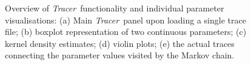 \documentclass[webpdf,mynatbib,nosurname,nogrid,noCE,noMSC]{SYS}
\newcommand{\tracer}{\emph{Tracer}}
\begin{document}
\begin{itemize}[leftmargin=*]
\begin{figure}[t]
\vspace{-0.25cm}
\caption{Overview of \tracer\ functionality and individual parameter visualisations: (a) Main \tracer\ panel upon loading a single trace file; (b) boxplot representation of two continuous parameters; (c) kernel density estimates; (d) violin plots; (e) the actual traces connecting the parameter values visited by the Markov chain.}
\label{fig:overview}
\end{figure}
%


\end{itemize}
\end{document}
